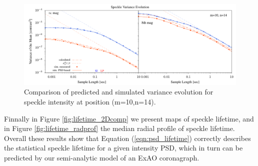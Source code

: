 \documentclass[10pt,preprint]{aastex631}
\begin{document}
\begin{figure}
\hspace{-0.3in}
\includegraphics[width=6.5in]{binVarComp_lp_10_14.pdf}
\caption{Comparison of predicted and simulated variance evolution for speckle intensity at position (m=10,n=14). \label{fig:binvarcomp}}
\end{figure}

Finnally in Figure \ref{fig:lifetime_2Dcomp} we present maps of speckle lifetime, and in Figure \ref{fig:lifetime_radprof} the median radial profile of speckle lifetime.  Overall these results show that Equation (\ref{eqn:psd_lifetime}) correctly describes the statistical speckle lifetime for a given intensity PSD, which in turn can be predicted by our semi-analytic model of an ExAO coronagraph.
\end{document}
